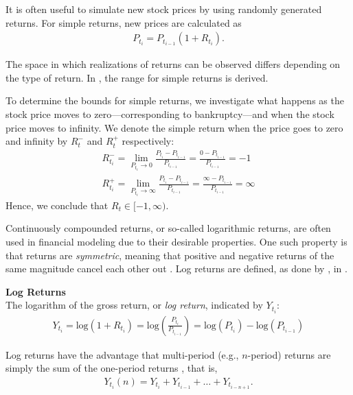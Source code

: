 It is often useful to simulate new stock prices by using randomly generated returns. For simple returns, new prices are calculated as
\begin{align*}
    P_{t_{i}} = P_{t_{i-1}}(1+R_{t_{i}}).
\end{align*}

The space in which realizations of returns can be observed differs depending on the type of return. In , the range for simple returns is derived. 

\begin{example}\label{ex:BoundsSimpleReturns}
    To determine the bounds for simple returns, we investigate what happens as the stock price moves to zero—corresponding to bankruptcy—and when the stock price moves to infinity. We denote the simple return when the price goes to zero and infinity by $R_t^-$ and $R_t^+$ respectively:   
    \begin{align*}
        R_{t_i}^- = \lim_{P_{t_i} \to 0} \frac{P_{t_i}-P_{t_{i-1}}}{P_{t_{i-1}}} = \frac{0-P_{t_{i-1}}}{P_{t_{i-1}}} = -1 \\
        R_{t_i}^+ = \lim_{P_{t_i} \to \infty} \frac{P_{t_i}-P_{t_{i-1}}}{P_{t_{i-1}}} = \frac{\infty-P_{t_{i-1}}}{P_{t_{i-1}}} = \infty    
    \end{align*}
    Hence, we conclude that $R_t \in [ -1,\infty )$. 
\end{example}

Continuously compounded returns, or so-called logarithmic returns, are often used in financial modeling due to their desirable properties. One such property is that returns are \emph{symmetric}, meaning that positive and negative returns of the same magnitude cancel each other out \citet[p.~4]{Danielsson2011}. Log returns are defined, as done by \citet[p.~3]{Danielsson2011}, in . 

\begin{definition}\label{def:logReturns}
    \textbf{Log Returns} \\
    The logarithm of the gross return, or \emph{log return}, indicated by $Y_{t_i}$:
    \begin{align*}
        Y_{t_i} = \mathrm{log}(1+R_{t_i}) = \mathrm{log} \left(\frac{P_{t_i}}{P_{t_{i-1}}}\right) = \mathrm{log}(P_{t_i}) - \mathrm{log}(P_{t_{i-1}})
    \end{align*}
\end{definition}

Log returns have the advantage that multi-period (e.g., $n$-period) returns are simply the sum of the one-period returns \citet[p.~3]{Danielsson2011}, that is, 
\begin{align*}
    Y_{t_i}(n) = Y_{t_i} + Y_{t_{i-1}} + \dots + Y_{t_{i-n+1}}.
\end{align*}

